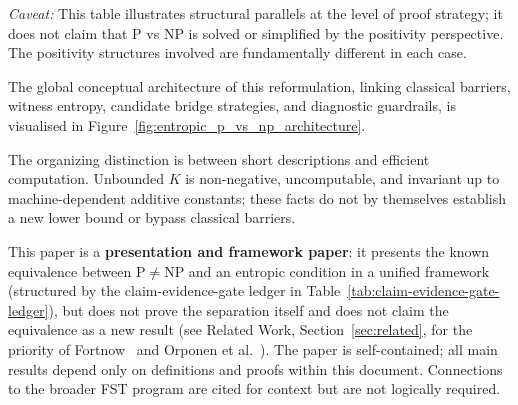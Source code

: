 \documentclass[aps,prd,twocolumn,superscriptaddress,nofootinbib]{revtex4-2}
\theoremstyle{definition}
\theoremstyle{remark}
\newcommand{\NP}{\mathrm{NP}}
\newcommand{\PP}{\mathrm{P}}
\begin{document}
\noindent\textit{Caveat:} This table illustrates structural parallels at the level of proof strategy; it does not claim that P vs NP is solved or simplified by the positivity perspective. The positivity structures involved are fundamentally different in each case.

The global conceptual architecture of this reformulation, linking classical barriers, witness entropy, candidate bridge strategies, and diagnostic guardrails, is visualised in Figure~\ref{fig:entropic_p_vs_np_architecture}.

The organizing distinction is between short descriptions and efficient computation. Unbounded $K$ is non-negative, uncomputable, and invariant up to machine-dependent additive constants; these facts do not by themselves establish a new lower bound or bypass classical barriers.

This paper is a \textbf{presentation and framework paper}: it presents the known equivalence between $\PP \neq \NP$ and an entropic condition in a unified framework (structured by the claim-evidence-gate ledger in Table~\ref{tab:claim-evidence-gate-ledger}), but does not prove the separation itself and does not claim the equivalence as a new result (see Related Work, Section~\ref{sec:related}, for the priority of Fortnow~\cite{Fortnow2000} and Orponen et al.~\cite{OrponenKoSchoeningWatanabe1994}). The paper is self-contained; all main results depend only on definitions and proofs within this document. Connections to the broader FST program are cited for context but are not logically required.

\begin{table}[t]
\caption{Claim-evidence-gate ledger for the paper.}
\label{tab:claim-evidence-gate-ledger}
\centering
\footnotesize
{}
\end{table}
\end{document}
